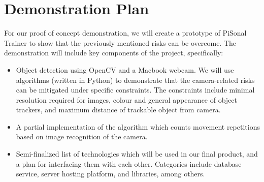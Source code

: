 \documentclass{article}
\begin{document}
\section*{Demonstration Plan}
For our proof of concept demonstration, we will create a prototype of PiSonal Trainer to show that the previously mentioned risks can be overcome. The demonstration will include key components of the project, specifically:
\begin{itemize}
    \item Object detection using OpenCV and a Macbook webcam. We will use algorithms (written in Python) to demonstrate that the camera-related risks can be mitigated under specific constraints. The constraints include minimal resolution required for images, colour and general appearance of object trackers, and maximum distance of trackable object from camera.
    \item A partial implementation of the algorithm which counts movement repetitions based on image recognition of the camera.
    \item Semi-finalized list of technologies which will be used in our final product, and a plan for interfacing them with each other. Categories include database service, server hosting platform, and libraries, among others.
\end{itemize}
\end{document}
